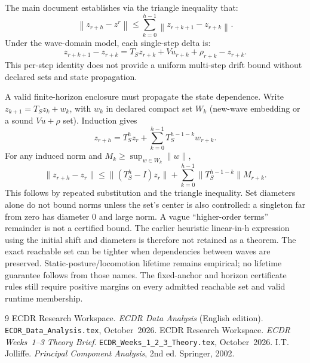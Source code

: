 \documentclass[11pt, a4paper]{article}
\theoremstyle{definition}
\theoremstyle{plain}
\newcommand{\norm}[2]{\left\|#1\right\|_{#2}}
\newcommand{\code}[1]{{\small\ttfamily\nolinkurl{#1}}}
\begin{document}
The main document establishes via the triangle inequality that:
\[
  \norm{z_{r+h} - z^r}{} \le \sum_{k=0}^{h-1} \norm{z_{r+k+1} - z_{r+k}}{}.
\]
Under the wave-domain model, each single-step delta is:
\[
  z_{r+k+1} - z_{r+k} = T_S z_{r+k} + V u_{r+k} + \rho_{r+k} - z_{r+k}.
\]
This per-step identity does not provide a uniform multi-step drift bound without declared sets and state propagation.

A valid finite-horizon enclosure must propagate the state dependence.
Write $z_{k+1}=T_Sz_k+w_k$, with $w_k$ in declared compact set $W_k$
(new-wave embedding or a sound $Vu+\rho$ set). Induction gives
\[
 z_{r+h}=T_S^h z_r+\sum_{k=0}^{h-1}T_S^{h-1-k}w_{r+k}.
\]
For any induced norm and $M_k\ge\sup_{w\in W_k}\|w\|$,
\[
 \|z_{r+h}-z_r\|\le\|(T_S^h-I)z_r\|
 +\sum_{k=0}^{h-1}\|T_S^{h-1-k}\|M_{r+k}.
\]
This follows by repeated substitution and the triangle inequality. Set
diameters alone do not bound norms unless the set's center is also controlled:
a singleton far from zero has diameter 0 and large norm. A vague
``higher-order terms'' remainder is not a certified bound. The earlier
heuristic linear-in-h expression using the initial shift and diameters is
therefore not retained as a theorem. The exact reachable set can be tighter
when dependencies between waves are preserved. Static-posture/locomotion
lifetime remains empirical; no lifetime guarantee follows from those names.
The fixed-anchor and horizon certificate rules still require positive margins
on every admitted reachable set and valid runtime membership.

\begin{thebibliography}{9}
  ECDR Research Workspace. \textit{ECDR Data Analysis} (English edition).
  \code{ECDR_Data_Analysis.tex}, October~2026.
  ECDR Research Workspace. \textit{ECDR Weeks~1--3 Theory Brief}.
  \code{ECDR_Weeks_1_2_3_Theory.tex}, October~2026.
  I.T. Jolliffe. \textit{Principal Component Analysis}, 2nd ed. Springer, 2002.
\end{thebibliography}
\end{document}
